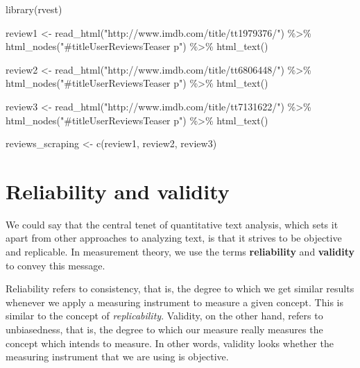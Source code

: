 \documentclass[
]{book}
\newenvironment{Shaded}{\begin{snugshade}}{\end{snugshade}}
\newcommand{\FunctionTok}[1]{\textcolor[rgb]{0.00,0.00,0.00}{#1}}
\newcommand{\NormalTok}[1]{#1}
\newcommand{\OtherTok}[1]{\textcolor[rgb]{0.56,0.35,0.01}{#1}}
\newcommand{\SpecialCharTok}[1]{\textcolor[rgb]{0.00,0.00,0.00}{#1}}
\newcommand{\StringTok}[1]{\textcolor[rgb]{0.31,0.60,0.02}{#1}}
\begin{document}
\begin{Shaded}
\begin{Highlighting}[]
\FunctionTok{library}\NormalTok{(rvest)}

\NormalTok{review1 }\OtherTok{\textless{}{-}} \FunctionTok{read\_html}\NormalTok{(}\StringTok{"http://www.imdb.com/title/tt1979376/"}\NormalTok{) }\SpecialCharTok{\%\textgreater{}\%}
 \FunctionTok{html\_nodes}\NormalTok{(}\StringTok{"\#titleUserReviewsTeaser p"}\NormalTok{) }\SpecialCharTok{\%\textgreater{}\%}
 \FunctionTok{html\_text}\NormalTok{()}

\NormalTok{review2 }\OtherTok{\textless{}{-}} \FunctionTok{read\_html}\NormalTok{(}\StringTok{"http://www.imdb.com/title/tt6806448/"}\NormalTok{) }\SpecialCharTok{\%\textgreater{}\%}
 \FunctionTok{html\_nodes}\NormalTok{(}\StringTok{"\#titleUserReviewsTeaser p"}\NormalTok{) }\SpecialCharTok{\%\textgreater{}\%}
 \FunctionTok{html\_text}\NormalTok{()}

\NormalTok{review3 }\OtherTok{\textless{}{-}} \FunctionTok{read\_html}\NormalTok{(}\StringTok{"http://www.imdb.com/title/tt7131622/"}\NormalTok{) }\SpecialCharTok{\%\textgreater{}\%}
 \FunctionTok{html\_nodes}\NormalTok{(}\StringTok{"\#titleUserReviewsTeaser p"}\NormalTok{) }\SpecialCharTok{\%\textgreater{}\%}
 \FunctionTok{html\_text}\NormalTok{()}

\NormalTok{reviews\_scraping }\OtherTok{\textless{}{-}} \FunctionTok{c}\NormalTok{(review1, review2, review3)}
\end{Highlighting}
\end{Shaded}

\hypertarget{reliability-and-validity}{%
\chapter{Reliability and validity}\label{reliability-and-validity}}

We could say that the central tenet of quantitative text analysis, which sets it apart from other approaches to analyzing text, is that it strives to be objective and replicable. In measurement theory, we use the terms \textbf{reliability} and \textbf{validity} to convey this message.

Reliability refers to consistency, that is, the degree to which we get similar results whenever we apply a measuring instrument to measure a given concept. This is similar to the concept of \emph{replicability}. Validity, on the other hand, refers to unbiasedness, that is, the degree to which our measure really measures the concept which intends to measure. In other words, validity looks whether the measuring instrument that we are using is objective.
\end{document}
